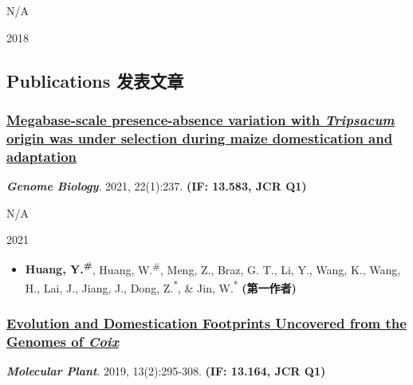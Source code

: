 \documentclass[]{article}
\providecommand{\tightlist}{%
  \setlength{\itemsep}{0pt}\setlength{\parskip}{0pt}}
\begin{document}
N/A

2018

\hypertarget{publications-ux53d1ux8868ux6587ux7ae0}{%
\subsection{Publications
发表文章}\label{publications-ux53d1ux8868ux6587ux7ae0}}

\hypertarget{megabase-scale-presence-absence-variation-with-tripsacum-origin-was-under-selection-during-maize-domestication-and-adaptation}{%
\subsubsection{\texorpdfstring{\href{https://doi.org/10.1186/s13059-021-02448-2}{Megabase-scale
presence-absence variation with \emph{Tripsacum} origin was under
selection during maize domestication and
adaptation}}{Megabase-scale presence-absence variation with Tripsacum origin was under selection during maize domestication and adaptation}}\label{megabase-scale-presence-absence-variation-with-tripsacum-origin-was-under-selection-during-maize-domestication-and-adaptation}}

\textbf{\emph{Genome Biology}}. 2021, 22(1):237. \textbf{(IF: 13.583,
JCR Q1)}

N/A

2021

\begin{itemize}
\tightlist
\item
  \textbf{Huang, Y.\textsuperscript{\#}}, Huang, W.\textsuperscript{\#},
  Meng, Z., Braz, G. T., Li, Y., Wang, K., Wang, H., Lai, J., Jiang, J.,
  Dong, Z.\textsuperscript{*}, \& Jin, W.\textsuperscript{*}
  \textbf{(第一作者)}
\end{itemize}

\hypertarget{evolution-and-domestication-footprints-uncovered-from-the-genomes-of-coix}{%
\subsubsection{\texorpdfstring{\href{http://dx.doi.org/10.1016/j.molp.2019.11.009}{Evolution
and Domestication Footprints Uncovered from the Genomes of
\emph{Coix}}}{Evolution and Domestication Footprints Uncovered from the Genomes of Coix}}\label{evolution-and-domestication-footprints-uncovered-from-the-genomes-of-coix}}

\textbf{\emph{Molecular Plant}}. 2019, 13(2):295-308. \textbf{(IF:
13.164, JCR Q1)}
\end{document}
